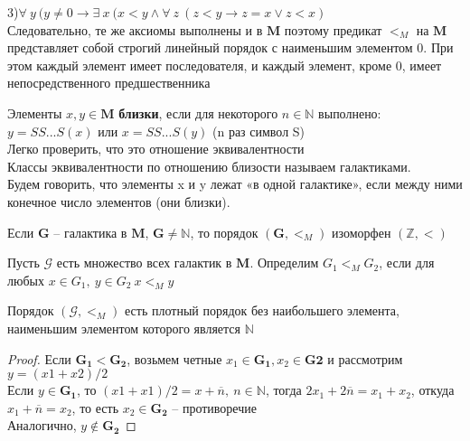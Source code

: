 3)$\forall\: y\: (y \neq 0 \rightarrow \exists \:x\:(x<y \wedge \forall\: z\:(z<y \rightarrow z=x \lor z<x)$\\
Следовательно, те же аксиомы выполнены и в $\boldsymbol{M}$ поэтому предикат $<_M$ на $\boldsymbol{M}$ представляет собой строгий линейный порядок с наименьшим элементом
0. При этом каждый элемент имеет последователя, и каждый элемент, кроме 0, имеет непосредственного предшественника
\begin{definition}
    Элементы $x,y \in \boldsymbol{M}$ \textbf{близки}, если для некоторого $n \in \mathbb{N}$ выполнено: $y=SS...S(x)$ или $x=SS...S(y)$ (n раз символ S)\\
    Легко проверить, что это отношение эквивалентности\\
    Классы эквивалентности по отношению близости называем галактиками.\\
    Будем говорить, что элементы x и y лежат «в одной галактике», если между ними конечное число элементов (они близки).
\end{definition}
\begin{proposition}
    Если $\boldsymbol{G}$ -- галактика в $\boldsymbol{M}$, $\boldsymbol{G} \neq \mathbb{N}$, то порядок $(\boldsymbol{G},<_M)$ изоморфен $(\mathbb{Z},<)$ 
\end{proposition}
    Пусть $\mathcal{G}$ есть множество всех галактик в $\boldsymbol{M}$. Определим $G_{1}<_{M} G_{2}$, если
для любых $x \in G_{1}, \ y \in G_{2}\: x<_{M} y$
\begin{theorem}
    Порядок  $\left(\mathcal{G},<_{M}\right)$ есть плотный порядок без наибольшего элемента, наименьшим элементом которого является $\mathbb{N}$
\end{theorem}
\begin{proof}
    Если $\boldsymbol{G_1}<\boldsymbol{G_2}$, возьмем четные $x_1 \in \boldsymbol{G_1},x_2 \in \boldsymbol{G2}$ и рассмотрим $y=(x1+x2)/2$\\
    Если $y \in \boldsymbol{G_1}$, то $(x1+x1)/2=x+\overline{n}, \ n\in \mathbb{N}$, тогда $2x_1+2\overline{n}=x_1+x_2$, откуда $x_1+\overline{n}=x_2$, то есть $x_2\in \boldsymbol{G_2}$ -- противоречие\\
    Аналогично, $y \notin \boldsymbol{G_2}$
\end{proof}